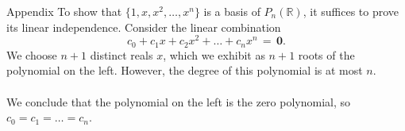 \documentclass{beamer}
\begin{document}
        \begin{frame}{Appendix}
                To show that $\{1, x, x^2, \dots, x^n\}$ is a basis of $P_n(\mathbb{R})$, it suffices to prove its linear independence.
                Consider the linear combination
                \[
                        c_0 + c_1x + c_2x^2 + \dots + c_nx^n \,=\, \mathbf{0}.
                \]
                \pause
                We choose $n + 1$ distinct reals $x$, which we exhibit as $n + 1$ roots of the polynomial on the left.
                However, the degree of this polynomial is at most $n$. \\~\\

                We conclude that the polynomial on the left is the zero polynomial, so $c_0 = c_1 = \dots = c_n$.
        \end{frame}
\end{document}
